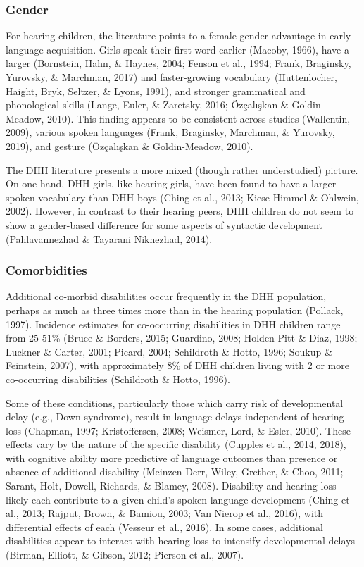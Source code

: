 \documentclass[english,man]{apa6}
\begin{document}
\hypertarget{gender}{%
\subsubsection{Gender}\label{gender}}

For hearing children, the literature points to a female gender advantage in early language acquisition. Girls speak their first word earlier (Macoby, 1966), have a larger (Bornstein, Hahn, \& Haynes, 2004; Fenson et al., 1994; Frank, Braginsky, Yurovsky, \& Marchman, 2017) and faster-growing vocabulary (Huttenlocher, Haight, Bryk, Seltzer, \& Lyons, 1991), and stronger grammatical and phonological skills (Lange, Euler, \& Zaretsky, 2016; Özçalışkan \& Goldin-Meadow, 2010). This finding appears to be consistent across studies (Wallentin, 2009), various spoken languages (Frank, Braginsky, Marchman, \& Yurovsky, 2019), and gesture (Özçalışkan \& Goldin-Meadow, 2010).

The DHH literature presents a more mixed (though rather understudied) picture. On one hand, DHH girls, like hearing girls, have been found to have a larger spoken vocabulary than DHH boys (Ching et al., 2013; Kiese-Himmel \& Ohlwein, 2002). However, in contrast to their hearing peers, DHH children do not seem to show a gender-based difference for some aspects of syntactic development (Pahlavannezhad \& Tayarani Niknezhad, 2014).

\hypertarget{comorbidities}{%
\subsubsection{Comorbidities}\label{comorbidities}}

Additional co-morbid disabilities occur frequently in the DHH population, perhaps as much as three times more than in the hearing population (Pollack, 1997). Incidence estimates for co-occurring disabilities in DHH children range from 25-51\% (Bruce \& Borders, 2015; Guardino, 2008; Holden-Pitt \& Diaz, 1998; Luckner \& Carter, 2001; Picard, 2004; Schildroth \& Hotto, 1996; Soukup \& Feinstein, 2007), with approximately 8\% of DHH children living with 2 or more co-occurring disabilities (Schildroth \& Hotto, 1996).

Some of these conditions, particularly those which carry risk of developmental delay (e.g., Down syndrome), result in language delays independent of hearing loss (Chapman, 1997; Kristoffersen, 2008; Weismer, Lord, \& Esler, 2010). These effects vary by the nature of the specific disability (Cupples et al., 2014, 2018), with cognitive ability more predictive of language outcomes than presence or absence of additional disability (Meinzen-Derr, Wiley, Grether, \& Choo, 2011; Sarant, Holt, Dowell, Richards, \& Blamey, 2008). Disability and hearing loss likely each contribute to a given child's spoken language development (Ching et al., 2013; Rajput, Brown, \& Bamiou, 2003; Van Nierop et al., 2016), with differential effects of each (Vesseur et al., 2016). In some cases, additional disabilities appear to interact with hearing loss to intensify developmental delays (Birman, Elliott, \& Gibson, 2012; Pierson et al., 2007).
\end{document}
